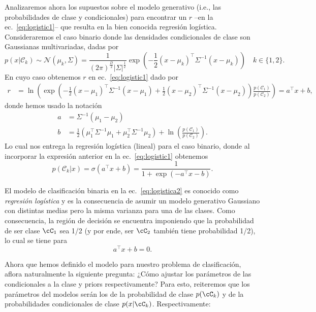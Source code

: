 Analizaremos ahora  los supuestos sobre el modelo generativo (i.e., las  probabilidades de clase y condicionales) para encontrar un $r$ --en la ec.~\eqref{eq:logistic1}-- que resulta en la bien conocida regresión logística. Consideraremos el caso binario donde las densidades condicionales de clase son Gaussianas multivariadas, dadas por
\begin{equation}
	p(x|\mathcal{C}_k) \sim \mathcal{N} (\mu_k,\Sigma) = \frac{1}{(2\pi)^\frac{D}{2}|\Sigma|^\frac{1}{2}}\exp(-\frac{1}{2}(x-\mu_k)^\top \Sigma^{-1}(x-\mu_k))\quad k\in\{1,2\}.
\end{equation}
En cuyo caso obtenemos $r$ en ec.~\eqref{eq:logistic1}  dado por
\begin{align}
r &= \ln\left(\exp\left(-\frac{1}{2}(x-\mu_1)^\top \Sigma^{-1}(x-\mu_1) +\frac{1}{2}(x-\mu_2)^\top \Sigma^{-1}(x-\mu_2)\right) \frac{p(\mathcal{C}_1)}{p(\mathcal{C}_2)} \right)= a^\top x+b,
\end{align}
donde hemos usado la notación
\begin{align}
a &= \Sigma^{-1}(\mu_1-\mu_2)\\
b &= \frac{1}{2}(\mu_1^\top \Sigma^{-1}\mu_1+\mu_2^\top \Sigma^{-1}\mu_2)
+\ln\left(\frac{p(\mathcal{C}_1)}{p(\mathcal{C}_2)}\right). 
\end{align}
Lo cual nos entrega la regresión logística (lineal) para el  caso binario, donde al incorporar la expresión anterior en la ec.~\eqref{eq:logistic1} obtenemos
\begin{equation}
	p(\mathcal{C}_k|x) = \sigma(a^\top x+b) = \frac{1}{1 + \exp{\left(-a^\top x-b\right)}}. \label{eq:logistica2}
\end{equation}

\begin{remark}\label{rem:reg_log} 
El modelo de clasificación binaria en la  ec.~\ref{eq:logistica2} es conocido como \emph{regresión logística} y es la consecuencia de asumir un modelo generativo Gaussiano con distintas medias pero la misma varianza para una de las clases. Como consecuencia, la región de decisión se encuentra imponiendo que la probabilidad de ser clase $\cC_1$ sea 1/2 (y por ende, ser $\cC_2$ también tiene probabilidad 1/2), lo cual se tiene para 
\begin{equation}
	a^\top x+b = 0.
\end{equation}
\end{remark}

Ahora que hemos definido el modelo para nuestro problema de clasificación, aflora naturalmente la siguiente pregunta: ¿Cómo ajustar los parámetros de las condicionales a la clase y priors respectivamente? Para esto, reiteremos que los parámetros del modelos serán los de la probabilidad de clase $p(\cC_k)$ y de la probabilidades condicionales de clase $p(x|\cC_k)$. Respectivamente: 

